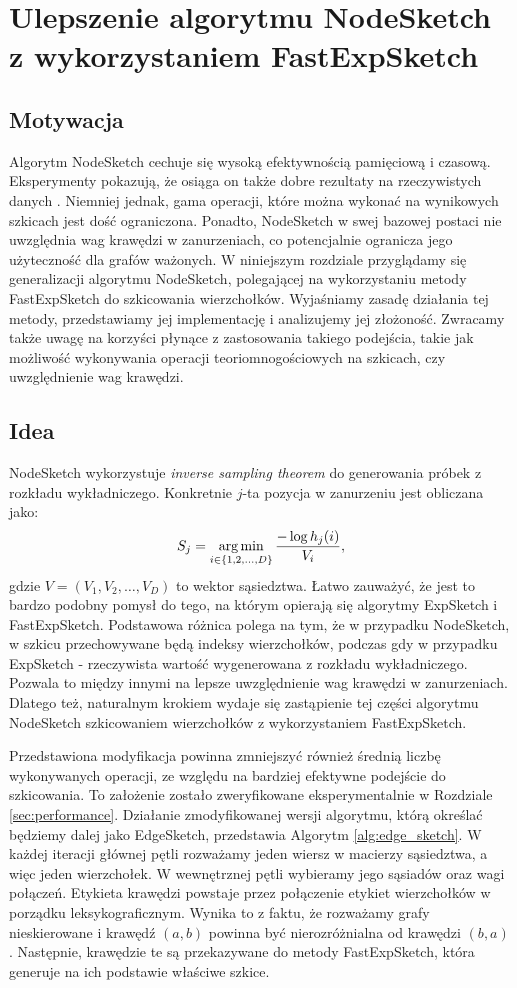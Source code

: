 \chapter{Ulepszenie algorytmu NodeSketch z wykorzystaniem FastExpSketch}
\section{Motywacja}
    Algorytm NodeSketch cechuje się wysoką efektywnością pamięciową i czasową. Eksperymenty pokazują, że osiąga on także dobre rezultaty na rzeczywistych danych \cite{Yang_Rosso_Li_Cudre-Mauroux_2019}. 
    Niemniej jednak, gama operacji, które można wykonać na wynikowych szkicach jest dość ograniczona. Ponadto, NodeSketch w swej bazowej postaci nie uwzględnia wag krawędzi w zanurzeniach, co potencjalnie ogranicza jego użyteczność dla grafów ważonych.   
    W niniejszym rozdziale przyglądamy się generalizacji algorytmu NodeSketch, polegającej na wykorzystaniu metody FastExpSketch do szkicowania wierzchołków. Wyjaśniamy zasadę działania tej metody, przedstawiamy jej implementację i analizujemy jej złożoność. Zwracamy także uwagę na korzyści płynące z zastosowania takiego podejścia, takie jak możliwość wykonywania operacji teoriomnogościowych na szkicach, czy uwzględnienie wag krawędzi.

\section{Idea}
    NodeSketch wykorzystuje \textit{inverse sampling theorem} do generowania próbek z rozkładu wykładniczego. Konkretnie $j$-ta pozycja w zanurzeniu jest obliczana jako: 
    \[  
        S_j = \operatorname*{arg\,min}_{i \in \{1,2,\dots, D\}} \frac{-\log h_{j}(i)}{V_i},
    \] 
    gdzie $V = (V_1, V_2, \dots, V_D)$ to wektor sąsiedztwa. Łatwo zauważyć, że jest to bardzo podobny pomysł do tego, na którym opierają się algorytmy ExpSketch i FastExpSketch. Podstawowa różnica polega na tym, że w przypadku NodeSketch, w szkicu przechowywane będą indeksy wierzchołków, podczas gdy w przypadku ExpSketch - rzeczywista wartość wygenerowana z rozkładu wykładniczego. Pozwala to między innymi na lepsze uwzględnienie wag krawędzi w zanurzeniach. Dlatego też, naturalnym krokiem wydaje się zastąpienie tej części algorytmu NodeSketch szkicowaniem wierzchołków z wykorzystaniem FastExpSketch.

    Przedstawiona modyfikacja powinna zmniejszyć również średnią liczbę wykonywanych operacji, ze względu na bardziej efektywne podejście do szkicowania. To założenie zostało zweryfikowane eksperymentalnie w Rozdziale \ref{sec:performance}. Działanie zmodyfikowanej wersji algorytmu, którą określać będziemy dalej jako EdgeSketch, przedstawia Algorytm \ref{alg:edge_sketch}. W każdej iteracji głównej pętli rozważamy jeden wiersz w macierzy sąsiedztwa, a więc jeden  wierzchołek. W wewnętrznej pętli wybieramy jego sąsiadów oraz wagi połączeń. Etykieta krawędzi powstaje przez połączenie etykiet wierzchołków w porządku leksykograficznym. Wynika to z faktu, że rozważamy grafy nieskierowane i krawędź $(a,b)$ powinna być nierozróżnialna od krawędzi $(b,a)$. Następnie, krawędzie te są przekazywane do metody FastExpSketch, która generuje na ich podstawie właściwe szkice.  

